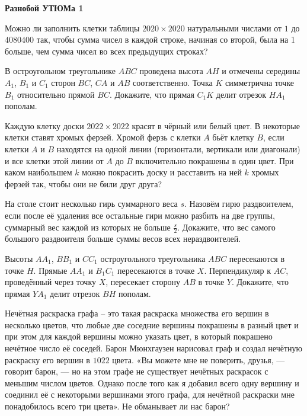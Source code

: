 \documentclass{article}
\begin{document}
    \large

    \begin{center}
        \textbf{Разнобой УТЮМа 1}
    \end{center}


    \begin{enumerate_boxed}

        \item Можно ли заполнить клетки таблицы $2020 \times 2020$ натуральными числами от $1$ до $4 080 400$ так, чтобы сумма чисел в каждой строке, начиная со второй, была на 1 больше, чем сумма чисел во всех предыдущих строках?

        \item В остроугольном треугольнике $ABC$ проведена высота $AH$ и отмечены середины $A_1$, $B_1$ и $C_1$ сторон $BC$, $CA$ и $AB$ соответственно.
        Точка $K$ симметрична точке $B_1$ относительно прямой $BC$.
        Докажите, что прямая $C_{1}K$ делит отрезок $HA_1$ пополам.

        \item Каждую клетку доски $2022 \times 2022$ красят в чёрный или белый цвет.
        В некоторые клетки ставят хромых ферзей.
        Хромой ферзь с клетки $A$ бьёт клетку $B$, если клетки $A$ и $B$ находятся на одной линии (горизонтали, вертикали или диагонали) и все клетки этой линии от $A$ до $B$ включительно покрашены в один цвет.
        При каком наибольшем $k$ можно покрасить доску и расставить на ней $k$ хромых ферзей так, чтобы они не били друг друга?

        \item На столе стоит несколько гирь суммарного веса $s$.
        Назовём гирю раздвоителем, если после её удаления все остальные гири можно разбить на две группы, суммарный вес каждой из которых не больше $\frac{s}{2}$.
        Докажите, что вес самого большого раздвоителя больше суммы весов всех нераздвоителей.

        \item Высоты $AA_1$, $BB_1$ и $CC_1$ остроугольного треугольника $ABC$ пересекаются в точке $H$.
        Прямые $AA_1$ и $B_{1}C_1$ пересекаются в точке $X$.
        Перпендикуляр к $AC$, проведённый через точку $X$, пересекает сторону $AB$ в точке $Y$.
        Докажите, что прямая $YA_1$ делит отрезок $BH$ пополам.

        \item Нечётная раскраска графа – это такая раскраска множества его вершин в несколько цветов, что любые две соседние вершины покрашены в разный цвет и при этом для каждой вершины можно указать цвет, в который покрашено нечётное число её соседей.
        Барон Мюнхгаузен нарисовал граф и создал нечётную раскраску его вершин в $1022$ цвета.
        «Вы можете мне не поверить, друзья, — говорит барон, — но на этом графе не существует нечётных раскрасок с меньшим числом цветов.
        Однако после того как я добавил всего одну вершину и соединил её с некоторыми вершинами этого графа, для нечётной раскраски мне понадобилось всего три цвета».
        Не обманывает ли нас барон?


\end{enumerate_boxed}
\end{document}

